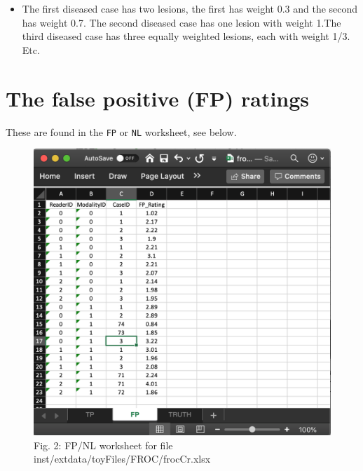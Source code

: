 \documentclass[]{book}
\providecommand{\tightlist}{%
  \setlength{\itemsep}{0pt}\setlength{\parskip}{0pt}}
\begin{document}
\begin{itemize}
\tightlist
\item
  The first diseased case has two lesions, the first has weight 0.3 and the second has weight 0.7. The second diseased case has one lesion with weight 1.The third diseased case has three equally weighted lesions, each with weight 1/3. Etc.
\end{itemize}

\hypertarget{the-false-positive-fp-ratings-1}{%
\section{The false positive (FP) ratings}\label{the-false-positive-fp-ratings-1}}

These are found in the \texttt{FP} or \texttt{NL} worksheet, see below.

\begin{figure}

{\centering \includegraphics[width=0.5\linewidth,height=0.2\textheight]{images/frocCrNL} 

}

\caption{Fig. 2: FP/NL worksheet for file inst/extdata/toyFiles/FROC/frocCr.xlsx}\label{fig:frocCrNL}
\end{figure}
\end{document}
